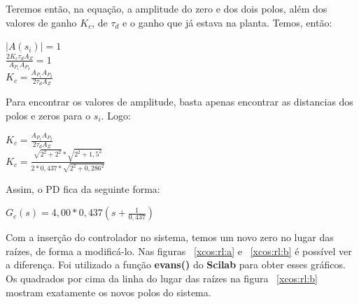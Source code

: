 Teremos então, na equação, a amplitude do zero e dos dois polos, além dos valores de ganho $K_c$, de $\tau_d$ e o ganho que já estava na planta. Temos, então:
\begin{center}
    $|A(s_i)| = 1$ \vspace{7pt}\\
    $\frac{2 K_c \tau_d A_Z}{A_P_1 A_P_2} = 1$ \vspace{7pt}\\
    $K_c = \frac{A_P_1 A_P_2}{2 \tau_d A_Z}$
\end{center}
Para encontrar os valores de amplitude, basta apenas encontrar as distancias dos polos e zeros para o $s_i$. Logo:
\begin{center}
    $K_c = \frac{A_P_1 A_P_2}{2 \tau_d A_Z}$ \vspace{7pt}\\
    $K_c = \frac{\sqrt{2^2 + 2^2}*\sqrt{2^2 + 1,5^2}}{2*0,437*\sqrt{2^2 + 0,286^2}}$ \vspace{7pt}\\
\end{center}

Assim, o PD fica da seguinte forma:
\begin{center}
    $G_c(s) = 4,00*0,437\left(s+\frac{1}{0,437}\right)$ \vspace{7pt}\\
\end{center}

Com a inserção do controlador no sistema, temos um novo zero no lugar das raízes, de forma a modificá-lo. Nas figuras ~\ref{xcos:rl:a} e ~\ref{xcos:rl:b} é possível ver a diferença. Foi utilizado a função \textbf{evans()} do \textbf{Scilab} para obter esses gráficos. Os quadrados por cima da linha do lugar das raízes na figura ~\ref{xcos:rl:b} mostram exatamente os novos polos do sistema.

